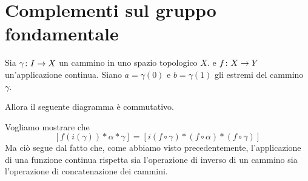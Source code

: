 \documentclass[a4paper]{article}
\begin{document}
\pagebreak

\section{Complementi sul gruppo fondamentale}

\begin{snippetproposition}{}
    Sia \(\gamma \colon I \to X\) un cammino in uno spazio topologico \(X\).
    e \(f \colon X \to Y\) un'applicazione continua.
    Siano \(a = \gamma(0)\) e \(b = \gamma(1)\) gli estremi del cammino \(\gamma\).
    \begin{center}
    \end{center}
    Allora il seguente diagramma è commutativo.
    \begin{center}
    \end{center}
\end{snippetproposition}


\begin{snippetproof}{}
    Vogliamo mostrare che
    \[
        [f(i(\gamma))\ast \alpha \ast \gamma]
        = [i(f\circ\gamma) \ast (f\circ \alpha) \ast (f \circ \gamma)]
    \]
    Ma ciò segue dal fatto che, come abbiamo visto precedentemente, l'applicazione di una funzione continua
    rispetta sia l'operazione di inverso di un cammino sia l'operazione di concatenazione dei cammini.
\end{snippetproof}
\end{document}
